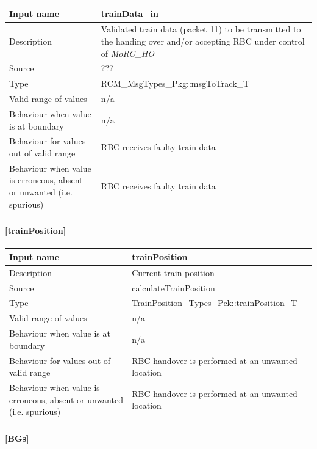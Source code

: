 \begin{longtable}{p{}p{}}
	\toprule
	Input name				& trainData\_in \\
	\midrule
	Description				& Validated train data (packet 11) to be transmitted to the handing over and/or accepting RBC under control of \emph{MoRC\_HO} \\
	\midrule
	Source					& ??? \\ 
	\midrule
	Type					& RCM\_MsgTypes\_Pkg::msgToTrack\_T \\
	\midrule
	Valid range of values	& n/a \\
	\midrule
	Behaviour when value is at boundary	& n/a \\
	\midrule
	Behaviour for values out of valid range	& RBC receives faulty train data \\
	\midrule
	Behaviour when value is erroneous, absent or unwanted (i.e. spurious) & RBC receives faulty train data \\
	\bottomrule
\end{longtable}

\paragraph{[trainPosition]}

\begin{longtable}{p{}p{}}
	\toprule
	Input name				& trainPosition \\
	\midrule
	Description				& Current train position \\
	\midrule
	Source					& calculateTrainPosition \\ 
	\midrule
	Type					& TrainPosition\_Types\_Pck::trainPosition\_T \\
	\midrule
	Valid range of values	& n/a \\
	\midrule
	Behaviour when value is at boundary	& n/a \\
	\midrule
	Behaviour for values out of valid range	& RBC handover is performed at an unwanted location \\
	\midrule
	Behaviour when value is erroneous, absent or unwanted (i.e. spurious) & RBC handover is performed at an unwanted location \\
	\bottomrule
\end{longtable}

\paragraph{[BGs]}

